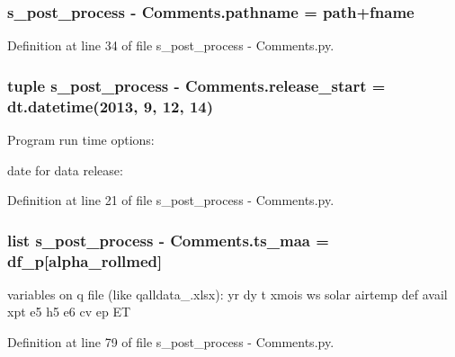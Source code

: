 \subsubsection[{pathname}]{\setlength{\rightskip}{0pt plus 5cm}s\+\_\+post\+\_\+process -\/ Comments.\+pathname = {\bf path}+{\bf fname}}\label{namespaces__post__process_01-_01_comments_a44e382ad617792a5ed02be95da593433}


Definition at line 34 of file s\+\_\+post\+\_\+process -\/ Comments.\+py.

\hypertarget{namespaces__post__process_01-_01_comments_a76368c115dbbbd72360ddbd4ec4a9a04}{}
\subsubsection[{release\+\_\+start}]{\setlength{\rightskip}{0pt plus 5cm}tuple s\+\_\+post\+\_\+process -\/ Comments.\+release\+\_\+start = dt.\+datetime(2013, 9, 12, 14)}\label{namespaces__post__process_01-_01_comments_a76368c115dbbbd72360ddbd4ec4a9a04}


Program run time options\+: 

date for data release\+: 

Definition at line 21 of file s\+\_\+post\+\_\+process -\/ Comments.\+py.

\hypertarget{namespaces__post__process_01-_01_comments_a5cad3f0b3385326f66c3ea7402ac4b4b}{}
\subsubsection[{ts\+\_\+maa}]{\setlength{\rightskip}{0pt plus 5cm}list s\+\_\+post\+\_\+process -\/ Comments.\+ts\+\_\+maa = {\bf df\+\_\+p}\mbox{[}\textquotesingle{}alpha\+\_\+rollmed\textquotesingle{}\mbox{]}}\label{namespaces__post__process_01-_01_comments_a5cad3f0b3385326f66c3ea7402ac4b4b}


variables on q file (like qalldata\+\_.\+xlsx)\+: yr dy t xmois ws solar airtemp def avail xpt e5 h5 e6 cv ep E\+T 



Definition at line 79 of file s\+\_\+post\+\_\+process -\/ Comments.\+py.

